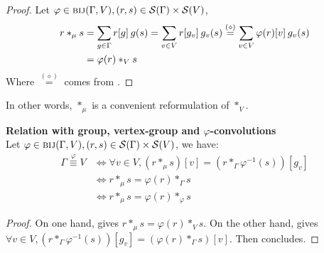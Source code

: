 \begin{proof}
Let $\varphi \in \bij(\Gamma, V),(r,s) \in \cs(\Gamma) \times \cs(V)$,
\begin{align*}
r \ast_\mu s & = \displaystyle \sum_{g \in \Gamma} r[g] \h{2} g(s)
  = \displaystyle \sum_{v \in V} r[g_v] \h{2} g_v(s)
  \overset{(\diamond)}{=} \displaystyle \sum_{v \in V} \varphi(r)[v] \h{2} g_v(s)\\
& =\varphi(r) \ast_{V} s
\end{align*}
Where $\overset{(\diamond)}{=}$ comes from .
\end{proof}

In other words, $\ast_\mu$ is a convenient reformulation of $\ast_{V}$.

\begin{lemma}\textbf{Relation with group, vertex-group and $\varphi$-convolutions}\\
Let $\varphi \in \bij(\Gamma, V),(r,s) \in \cs(\Gamma) \times \cs(V)$, we have:
\begin{align*}
\Gamma \overset{\varphi}{\equiv} V & \Leftrightarrow \forall v \in V, (r \ast_\mu s)[v] = (r \ast_{\Gamma} \varphi^{-1}(s))[g_v]\\
& \Leftrightarrow r \ast_\mu s = \varphi(r) \ast_{\Gamma} s\\
& \Leftrightarrow r \ast_\mu s = \varphi(r) \ast_{\varphi} s
\end{align*}
\label{lem:rel12m}
\end{lemma}

\begin{proof}
On one hand,  gives $r \ast_\mu s = \varphi(r) \ast_{V} s$. On the other hand,  gives $\forall v \in V,
(r \ast_{\Gamma} \varphi^{-1}(s))[g_v] = (\varphi(r) \ast_{\Gamma} s)[v]$. Then  concludes.
\end{proof}





